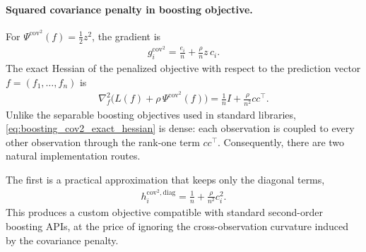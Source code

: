 \documentclass{article}
\theoremstyle{plain}
\theoremstyle{definition}
\newcommand{\1}{\mathbf{1}}
\begin{document}
\paragraph{Squared covariance penalty in boosting objective.}
For \(\Psi^{\mathrm{cov}^2}(f)=\tfrac12 z^2\), the gradient is
\begin{align}
    \label{eq:boosting_cov2_gradient}
    g_i^{\mathrm{cov}^2}
    =
    \frac{e_i}{n}
    +
    \frac{\rho}{n}z\,c_i.
\end{align}
The exact Hessian of the penalized objective with respect to the prediction vector \(f=(f_1,\dots,f_n)\) is
\begin{align}
    \label{eq:boosting_cov2_exact_hessian}
    \nabla_f^2
    \bigl(L(f)+\rho\,\Psi^{\mathrm{cov}^2}(f)\bigr)
    =
    \frac{1}{n}I
    +
    \frac{\rho}{n^2}cc^\top.
\end{align}
Unlike the separable boosting objectives used in standard libraries, \eqref{eq:boosting_cov2_exact_hessian} is dense: each observation is coupled to every other observation through the rank-one term \(cc^\top\). Consequently, there are two natural implementation routes.

The first is a practical approximation that keeps only the diagonal terms,
\begin{align}
    \label{eq:boosting_cov2_diag_hessian}
    h_i^{\mathrm{cov}^2,\mathrm{diag}}
    =
    \frac{1}{n}
    +
    \frac{\rho}{n^2}c_i^2.
\end{align}
This produces a custom objective compatible with standard second-order boosting APIs, at the price of ignoring the cross-observation curvature induced by the covariance penalty.
\end{document}
